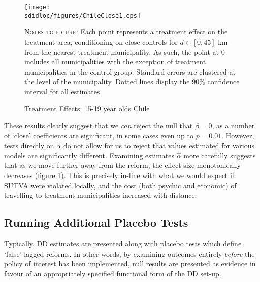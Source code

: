 \begin{figure}[h!]
\texttt{[image: \\sdidloc/figures/ChileClose1.eps]}
\caption{Treatment Effects: 15-19 year olds Chile}
\label{Sfig:ChileAlpha}
\vspace{2mm}
\begin{footnotesize}
\textsc{Notes to figure}: Each point represents a treatment effect on the 
treatment area, conditioning on close controls for $d\in [0,45]$ km from the 
nearest treatment municipality.  As such, the point at 0 includes all 
municipalities with the exception of treatment municipalities in the control 
group.  Standard errors are clustered at the level of the municipality.  Dotted 
lines display the 90\% confidence interval for all estimates.
\end{footnotesize}
\end{figure}

These results clearly suggest that we \emph{can} reject the null that $\beta=0$, 
as a number of `close' coefficients are significant, in some cases even up to 
$p=0.01$.  However, tests directly on $\alpha$ do not allow for us to reject that 
values estimated for various models are significantly different.  Examining 
estimates $\hat\alpha$ more carefully suggests that as we move further away from 
the reform, the effect size monotonically decreases (figure 
\ref{Sfig:ChileAlpha}).  This is precisely in-line with what we would expect if 
SUTVA were violated locally, and the cost (both psychic and economic) of 
travelling to treatment municipalities increased with distance.

\subsection{Running Additional Placebo Tests}
Typically, DD estimates are presented along with placebo tests which define 
`false' lagged reforms.  In other words, by examining outcomes entirely 
\emph{before} the policy of interest has been implemented, null results are 
presented as evidence in favour of an appropriately specified functional form of 
the DD set-up.


